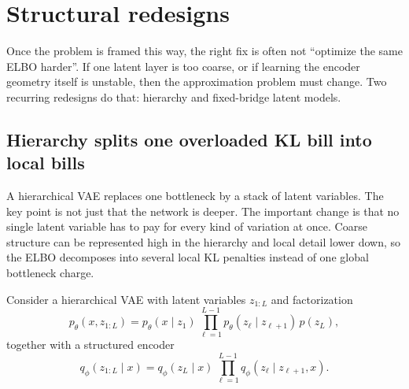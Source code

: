 \documentclass[11pt]{article}
\begin{document}
\section{Structural redesigns}
\label{sec:structural-redesigns}

Once the problem is framed this way, the right fix is often not ``optimize the same ELBO harder''.
If one latent layer is too coarse, or if learning the encoder geometry itself is unstable, then the approximation problem must change.
Two recurring redesigns do that:
hierarchy and fixed-bridge latent models.

\subsection{Hierarchy splits one overloaded KL bill into local bills}
\label{subsec:hierarchy-redistributes-kl}

A hierarchical VAE replaces one bottleneck by a stack of latent variables.
The key point is not just that the network is deeper.
The important change is that no single latent variable has to pay for every kind of variation at once.
Coarse structure can be represented high in the hierarchy and local detail lower down, so the ELBO decomposes into several local KL penalties instead of one global bottleneck charge.

Consider a hierarchical VAE with latent variables \(z_{1:L}\) and factorization
\[
  p_\theta(x,z_{1:L})
  =
  p_\theta(x\mid z_1)\,
  \prod_{\ell=1}^{L-1} p_\theta(z_\ell\mid z_{\ell+1})\,
  p(z_L),
\]
together with a structured encoder
\[
  q_\phi(z_{1:L}\mid x)
  =
  q_\phi(z_L\mid x)\,
  \prod_{\ell=1}^{L-1} q_\phi(z_\ell\mid z_{\ell+1},x).
\]
\end{document}
